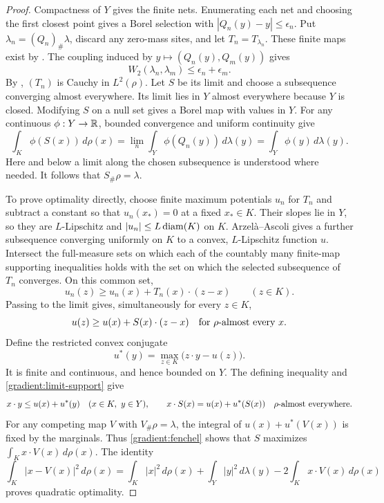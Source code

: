 \begin{proof}
Compactness of $Y$ gives the finite nets.  Enumerating each net and
choosing the first closest point gives a Borel selection with
$|Q_n(y)-y|\le\epsilon_n$.  Put $\lambda_n=(Q_n)_\#\lambda$,
discard any zero-mass sites, and let $T_n=T_{\lambda_n}$.
These finite maps exist by .
The coupling induced by $y\mapsto(Q_n(y),Q_m(y))$ gives
\[
 W_2(\lambda_n,\lambda_m)\le\epsilon_n+\epsilon_m.
\]
By , $(T_n)$ is Cauchy in $L^2(\rho)$.
Let $S$ be its limit and choose a subsequence converging almost
everywhere.  Its limit lies in $Y$ almost everywhere because $Y$ is
closed.  Modifying $S$ on a null set gives a Borel map with values in
$Y$.  For any continuous $\phi:Y\to\mathbb R$, bounded convergence and
uniform continuity give
\[
 \int_K\phi(S(x))\,d\rho(x)
 =\lim_n\int_Y\phi(Q_n(y))\,d\lambda(y)
 =\int_Y\phi(y)\,d\lambda(y).
\]
Here and below a limit along the chosen subsequence is understood where
needed.  It follows that $S_\#\rho=\lambda$.

To prove optimality directly, choose finite maximum potentials $u_n$
for $T_n$ and subtract a constant so that $u_n(x_*)=0$ at a fixed
$x_*\in K$.  Their slopes lie in $Y$, so they are $L$-Lipschitz and
$|u_n|\le L\operatorname{diam}(K)$ on $K$.  Arzel\`a--Ascoli gives a further
subsequence converging uniformly on $K$ to a convex, $L$-Lipschitz
function $u$.  Intersect the full-measure sets on which each of the
countably many finite-map supporting inequalities holds with the set
on which the selected subsequence of $T_n$ converges.  On this common set,
\[
 u_n(z)\ge u_n(x)+T_n(x)\cdot(z-x)\qquad(z\in K).
\]
Passing to the limit gives, simultaneously for every $z\in K$,
\begin{equation}\label{gradient:limit-support}
 u(z)\ge u(x)+S(x)\cdot(z-x)
 \quad\hbox{for $\rho$-almost every }x.
\end{equation}
Define the restricted convex conjugate
\[
 u^*(y)=\max_{z\in K}\bigl(z\cdot y-u(z)\bigr).
\]
It is finite and continuous, and hence bounded on $Y$.  The defining
inequality and \eqref{gradient:limit-support} give
\begin{equation}\label{gradient:fenchel}
 x\cdot y\le u(x)+u^*(y)\quad(x\in K,\ y\in Y),
 \qquad
 x\cdot S(x)=u(x)+u^*(S(x))\quad\rho\hbox{-almost everywhere}.
\end{equation}
For any competing map $V$ with $V_\#\rho=\lambda$, the integral of
$u(x)+u^*(V(x))$ is fixed by the marginals.  Thus
\eqref{gradient:fenchel} shows that $S$ maximizes
$\int_Kx\cdot V(x)\,d\rho(x)$.  The identity
\[
 \int_K|x-V(x)|^2\,d\rho(x)
 =\int_K|x|^2\,d\rho(x)+\int_Y|y|^2\,d\lambda(y)
       -2\int_Kx\cdot V(x)\,d\rho(x)
\]
proves quadratic optimality.


\end{proof}
